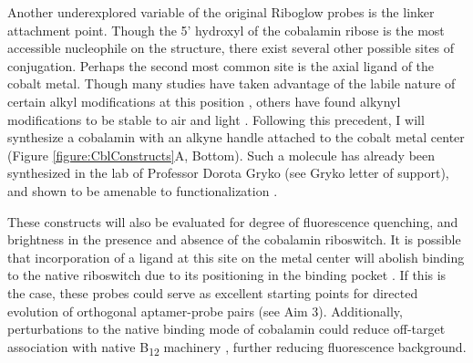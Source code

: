 Another underexplored variable of the original Riboglow probes is the linker attachment point.
Though the 5' hydroxyl of the cobalamin ribose is the most accessible nucleophile on the structure, there exist several other possible sites of conjugation.
Perhaps the second most common site is the axial ligand of the cobalt metal.
Though many studies have taken advantage of the labile nature of certain alkyl modifications at this position \cite{ShellVitaminB12Tunable2015}, others have found alkynyl modifications to be stable to air and light \cite{ChrominskiReductionfreesynthesisstable2013,RuetzMarkusPhenylethynylcobalaminLightStable2013}.
Following this precedent, I will synthesize a cobalamin with an alkyne handle attached to the cobalt metal center (Figure \ref{figure:CblConstructs}A, Bottom).
Such a molecule has already been synthesized in the lab of Professor Dorota Gryko (see Gryko letter of support), and shown to be amenable to functionalization \cite{ChrominskiVitaminB12Derivatives2014}.

These constructs will also be evaluated for degree of fluorescence quenching, and brightness in the presence and absence of the cobalamin riboswitch.
It is possible that incorporation of a ligand at this site on the metal center will abolish binding to the native riboswitch due to its positioning in the binding pocket \cite{JohnsonJrB12cofactorsdirectly2012}.
If this is the case, these probes could serve as excellent starting points for directed evolution of orthogonal aptamer-probe pairs (see Aim 3).
Additionally, perturbations to the native binding mode of cobalamin could reduce off-target association with native B\textsubscript{12} machinery \cite{PathareSynthesisCobalaminBiotin1996}, further reducing fluorescence background.

